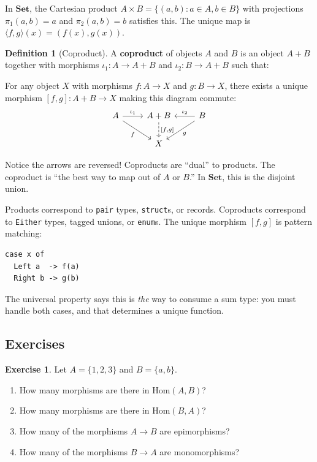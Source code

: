 \documentclass[11pt]{article}
\newcommand{\cat}[1]{\mathbf{#1}}
\newcommand{\Set}{\cat{Set}}
\newcommand{\Hom}{\mathrm{Hom}}
\theoremstyle{definition}
\newtheorem{definition}{Definition}[section]
\newtheorem{exercise}{Exercise}[section]
\theoremstyle{plain}
\theoremstyle{remark}
\begin{document}
In $\Set$, the Cartesian product $A \times B = \{(a, b) : a \in A, b \in B\}$ with projections $\pi_1(a,b) = a$ and $\pi_2(a,b) = b$ satisfies this. The unique map is $\langle f, g \rangle(x) = (f(x), g(x))$.

\begin{definition}[Coproduct]
A \textbf{coproduct} of objects $A$ and $B$ is an object $A + B$ together with morphisms $\iota_1: A \to A + B$ and $\iota_2: B \to A + B$ such that:

For any object $X$ with morphisms $f: A \to X$ and $g: B \to X$, there exists a unique morphism $[f, g]: A + B \to X$ making this diagram commute:
\[
\begin{tikzcd}
A \arrow[r, "\iota_1"] \arrow[dr, "f"'] & A + B \arrow[d, dashed, "{[f, g]}"] & B \arrow[l, "\iota_2"'] \arrow[dl, "g"] \\
 & X &
\end{tikzcd}
\]
\end{definition}

Notice the arrows are reversed! Coproducts are ``dual'' to products. The coproduct is ``the best way to map out of $A$ or $B$.'' In $\Set$, this is the disjoint union.

\begin{programmingnote}
Products correspond to \texttt{pair} types, \texttt{struct}s, or records. Coproducts correspond to \texttt{Either} types, tagged unions, or \texttt{enum}s. The unique morphism $[f, g]$ is pattern matching:
\begin{verbatim}
case x of
  Left a  -> f(a)
  Right b -> g(b)
\end{verbatim}
The universal property says this is \emph{the} way to consume a sum type: you must handle both cases, and that determines a unique function.
\end{programmingnote}

\subsection{Exercises}

\begin{exercise}
Let $A = \{1, 2, 3\}$ and $B = \{a, b\}$.
\begin{enumerate}[label=(\alph*)]
  \item How many morphisms are there in $\Hom(A, B)$?
  \item How many morphisms are there in $\Hom(B, A)$?
  \item How many of the morphisms $A \to B$ are epimorphisms?
  \item How many of the morphisms $B \to A$ are monomorphisms?
\end{enumerate}
\end{exercise}
\end{document}
